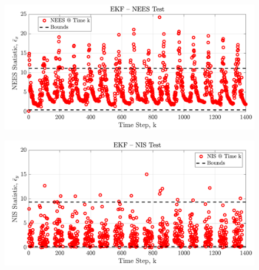\documentclass[a4paper]{aiaa-tc}
\begin{document}
  \begin{figure}[H]
 \centering
 \includegraphics[width=\textwidth]{Figures/EKF_NEES.pdf}
 \end{figure}
 
  \begin{figure}[H]
 \centering
 \includegraphics[width=\textwidth]{Figures/EKF_NIS.pdf}
 \end{figure}
 


	
	
\end{document}
